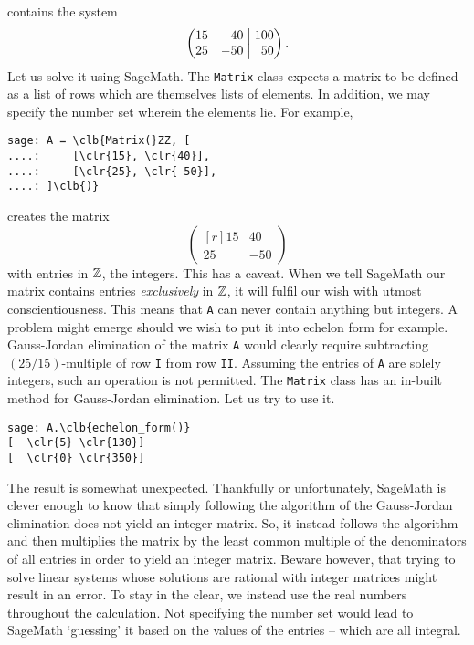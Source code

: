  contains the system
\[
 \left(
  \begin{matrix*}[r]
   15 & 40\\
   25 & -50
  \end{matrix*}
  \hspace{1mm}
 \right|
 \left.
  \begin{matrix*}[r]
   100\\
   50
  \end{matrix*}
 \right).
\]
Let us solve it using SageMath. The \texttt{Matrix} class expects a matrix to be
defined as a list of rows which are themselves lists of elements. In addition,
we may specify the number set wherein the elements lie. For example,
\begin{Verbatim}
sage: A = \clb{Matrix(}ZZ, [
....:     [\clr{15}, \clr{40}],
....:     [\clr{25}, \clr{-50}],
....: ]\clb{)}
\end{Verbatim}
creates the matrix
\[
 \left(
  \begin{matrix*}[r]
   15 & 40\\
   25 & -50
  \end{matrix*}
 \right)
\]
with entries in $\mathbb{Z}$, the integers. This has a caveat. When we tell SageMath our
matrix contains entries \emph{exclusively} in $\mathbb{Z}$, it will fulfil our wish with
utmost conscientiousness. This means that \texttt{A} can never contain anything
but integers. A problem might emerge should we wish to put it into echelon form
for example. Gauss-Jordan elimination of the matrix \texttt{A} would clearly
require subtracting $(25 / 15)$-multiple of row \texttt{I} from row \texttt{II}.
Assuming the entries of \texttt{A} are solely integers, such an operation is not
permitted. The \texttt{Matrix} class has an in-built method for Gauss-Jordan
elimination. Let us try to use it.
\begin{Verbatim}
sage: A.\clb{echelon_form()}
[  \clr{5} \clr{130}]
[  \clr{0} \clr{350}]
\end{Verbatim}
The result is somewhat unexpected. Thankfully or unfortunately, SageMath is
clever enough to know that simply following the algorithm of the Gauss-Jordan
elimination does not yield an integer matrix. So, it instead follows the
algorithm and then multiplies the matrix by the least common multiple of the
denominators of all entries in order to yield an integer matrix. Beware however,
that trying to solve linear systems whose solutions are rational with integer
matrices might result in an error. To stay in the clear, we instead use the real
numbers throughout the calculation. Not specifying the number set would lead to
SageMath `guessing' it based on the values of the entries -- which are all
integral.

